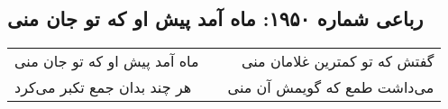 \begin{center}
\section*{رباعی شماره ۱۹۵۰: ماه آمد پیش او که تو جان منی}
\label{sec:1950}
\begin{longtable}{l p{0.5cm} r}
ماه آمد پیش او که تو جان منی
&&
گفتش که تو کمترین غلامان منی
\\
هر چند بدان جمع تکبر می‌کرد
&&
می‌داشت طمع که گویمش آن منی
\\
\end{longtable}
\end{center}
